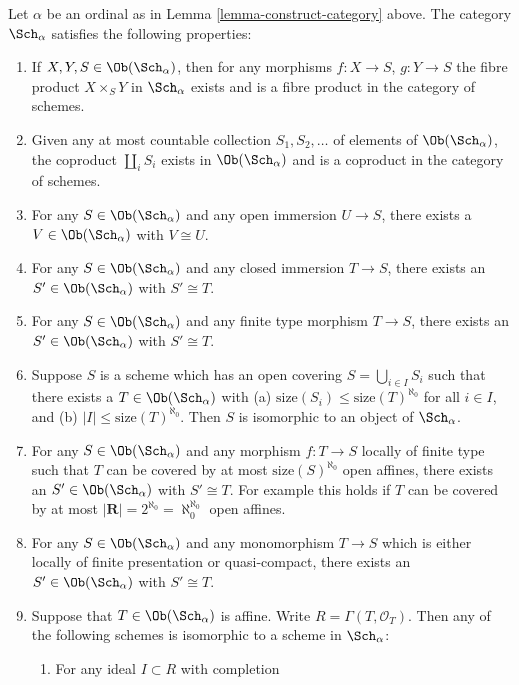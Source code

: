 \begin{lemma}
\label{lemma-what-is-in-it}
Let $\alpha$ be an ordinal as in Lemma \ref{lemma-construct-category} above.
The category $\Sch_\alpha$ satisfies the following
properties:
\begin{enumerate}
\item If $X, Y, S \in \Ob(\Sch_\alpha)$, then
for any morphisms $f : X \to S$, $g : Y \to S$ the fibre
product $X \times_S Y$ in $\Sch_\alpha$ exists
and is a fibre product in the category of schemes.
\item Given any at most countable collection $S_1, S_2, \ldots$
of elements of $\Ob(\Sch_\alpha)$, the coproduct
$\coprod_i S_i$ exists in $\Ob(\Sch_\alpha)$ and
is a coproduct in the category of schemes.
\item For any $S \in \Ob(\Sch_\alpha)$ and
any open immersion $U \to S$, there exists a
$V \in \Ob(\Sch_\alpha)$ with $V \cong U$.
\item For any $S \in \Ob(\Sch_\alpha)$ and
any closed immersion $T \to S$, there exists an
$S' \in \Ob(\Sch_\alpha)$ with $S' \cong T$.
\item For any $S \in \Ob(\Sch_\alpha)$ and
any finite type morphism $T \to S$, there exists an
$S' \in \Ob(\Sch_\alpha)$ with $S' \cong T$.
\item Suppose $S$ is a scheme which has an open covering
$S = \bigcup_{i \in I} S_i$ such that there exists
a $T \in \Ob(\Sch_\alpha)$ with
(a) $\text{size}(S_i) \leq \text{size}(T)^{\aleph_0}$ for all
$i \in I$, and (b) $|I| \leq \text{size}(T)^{\aleph_0}$.
Then $S$ is isomorphic to an object of $\Sch_\alpha$.
\item For any $S \in \Ob(\Sch_\alpha)$ and
any morphism $f : T \to S$ locally of finite type such
that $T$ can be covered by at most
$\text{size}(S)^{\aleph_0}$ open affines, there exists an
$S' \in \Ob(\Sch_\alpha)$ with $S' \cong T$.
For example this holds if $T$ can be covered by at most
$|\mathbf{R}| = 2^{\aleph_0} = \aleph_0^{\aleph_0}$ open affines.
\item For any $S \in \Ob(\Sch_\alpha)$ and
any monomorphism $T \to S$ which is either locally of finite presentation
or quasi-compact, there exists an
$S' \in \Ob(\Sch_\alpha)$ with $S' \cong T$.
\item Suppose that $T \in \Ob(\Sch_\alpha)$ is
affine. Write $R = \Gamma(T, \mathcal{O}_T)$.
Then any of the following schemes is isomorphic to a scheme
in $\Sch_\alpha$:
\begin{enumerate}
\item For any ideal $I \subset R$ with completion

\end{enumerate}
\end{enumerate}
\end{lemma}

